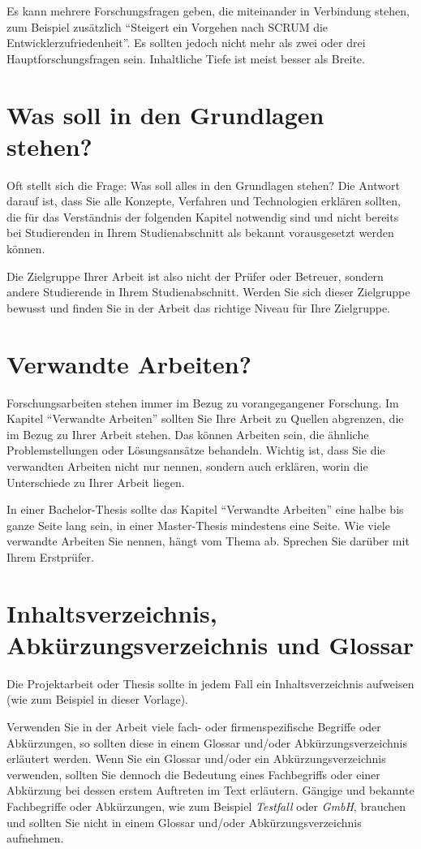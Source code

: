 Es kann mehrere Forschungsfragen geben, die miteinander in Verbindung stehen, zum Beispiel zusätzlich \enquote{Steigert ein Vorgehen nach SCRUM die Entwicklerzufriedenheit}. Es sollten jedoch nicht mehr als zwei oder drei Hauptforschungsfragen sein. Inhaltliche Tiefe ist meist besser als Breite.


\section{Was soll in den Grundlagen stehen?}

Oft stellt sich die Frage: Was soll alles in den Grundlagen stehen? Die Antwort darauf ist, dass Sie alle Konzepte, Verfahren und Technologien erklären sollten, die für das Verständnis der folgenden Kapitel notwendig sind und nicht bereits bei Studierenden in Ihrem Studienabschnitt als  bekannt vorausgesetzt werden können.

Die Zielgruppe Ihrer Arbeit ist also nicht der Prüfer oder Betreuer, sondern andere Studierende in Ihrem Studienabschnitt. Werden Sie sich dieser Zielgruppe bewusst und finden Sie in der Arbeit das richtige Niveau für Ihre Zielgruppe.

\section{Verwandte Arbeiten?}
\label{sec:verwandte-arbeiten}

Forschungsarbeiten stehen immer im Bezug zu vorangegangener Forschung. Im Kapitel  \enquote{Verwandte Arbeiten} sollten Sie Ihre Arbeit zu Quellen abgrenzen, die im Bezug zu Ihrer Arbeit stehen. Das können Arbeiten sein, die ähnliche Problemstellungen oder Lösungsansätze behandeln. Wichtig ist, dass Sie die verwandten Arbeiten nicht nur nennen, sondern auch erklären, worin die Unterschiede zu Ihrer Arbeit liegen.

In einer Bachelor-Thesis sollte das Kapitel \enquote{Verwandte Arbeiten} eine halbe bis ganze Seite lang sein, in einer Master-Thesis mindestens eine Seite. Wie viele verwandte Arbeiten Sie nennen, hängt vom Thema ab. Sprechen Sie darüber mit Ihrem Erstprüfer.

\section{Inhaltsverzeichnis, Abkürzungsverzeichnis und Glossar}
\label{sec:inhaltsverzeichnis-und-glossar}

Die Projektarbeit oder Thesis sollte in jedem Fall ein Inhaltsverzeichnis aufweisen (wie zum Beispiel in dieser Vorlage). 

Verwenden Sie in der Arbeit viele fach- oder firmenspezifische Begriffe oder Abkürzungen, so sollten diese in einem Glossar und/oder Abkürzungsverzeichnis erläutert werden. Wenn Sie ein Glossar und/oder ein Abkürzungsverzeichnis verwenden, sollten Sie dennoch die Bedeutung eines Fachbegriffs oder einer Abkürzung bei dessen erstem Auftreten im Text erläutern.  Gängige und bekannte Fachbegriffe oder Abkürzungen, wie zum Beispiel \textit{Testfall} oder \textit{GmbH}, brauchen und sollten Sie  nicht in einem Glossar und/oder Abkürzungsverzeichnis aufnehmen.
